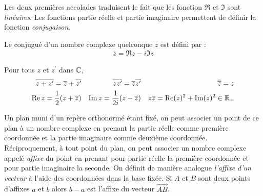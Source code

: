 Les deux premières accolades traduisent le fait que les fonction $\Re$ et $\Im$ sont \emph{linéaires}.\newline
{}
Les fonctions partie réelle et partie imaginaire permettent de définir la fonction \emph{conjugaison}.
\begin{defi}
 Le conjugué d'un nombre complexe quelconque $z$ est défini par :
\begin{align*}
 \overline{z} = \Re z - i \Im z
\end{align*}
\end{defi}
\begin{prop}
 Pour tous $z$ et  $z^\prime$ dans $\mathbb{C}$, 
\begin{align*}
 \overline{z+z^\prime} = \overline{z} + \overline{z^\prime} & &
\overline{z z^\prime} = \overline{z}  \overline{z^\prime} & &
 \overline{\overline{z}} = z \\
\mathop{\mathrm{Re}} z = \dfrac{1}{2}(z+\overline{z}) & &
\mathop{\mathrm{Im}} z = \dfrac{1}{2i}(z-\overline{z}) & &
z\overline{z} = \mathop{\mathrm{Re}}(z)^2+\mathop{\mathrm{Im}}(z)^2 \in \mathbb{R}_+
\end{align*}
\end{prop}
\begin{defi}
 Un plan muni d'un repère orthonormé étant fixé, on peut associer un point de ce plan à un nombre complexe en prenant la partie réelle comme première coordonnée et la partie imaginaire comme deuxième coordonnée.\newline
 Réciproquement, à tout point du plan, on peut associer un nombre complexe appelé \emph{affixe} du point en prenant pour partie réelle la première coordonnée et pour partie imaginaire la seconde. On définit de manière analogue \emph{l'affixe d'un vecteur} à l'aide des coordonnées dans la base fixée.\newline
 Si $A$ et $B$ sont deux points d'affixes $a$ et $b$ alors $b-a$ est l'affixe du vecteur $\overrightarrow{AB}$.
\end{defi}

